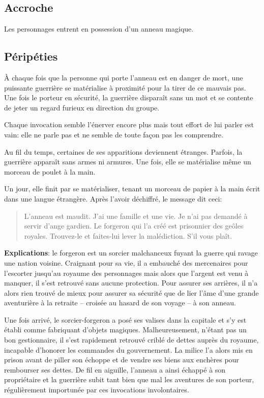 \documentclass[a5paper,pagesize,10pt,bibliography=totoc,numbers=noenddot,
headings=normal,DIV=9,twoside=false]{scrbook}
\begin{document}
\subsection*{Accroche}

Les personnages entrent en possession d'un anneau magique.

\subsection*{Péripéties}

À chaque fois que la personne qui porte l'anneau est en danger de mort, une puissante guerrière se matérialise à proximité pour la tirer de ce mauvais pas.
Une fois le porteur en sécurité, la guerrière disparaît sans un mot et se contente de jeter un regard furieux en direction du groupe.

Chaque invocation semble l'énerver encore plus mais tout effort de lui parler est vain: elle ne parle pas et ne semble de toute façon pas les comprendre.

Au fil du temps, certaines de ses apparitions deviennent étranges. Parfois, la guerrière apparaît sans armes ni armures.
Une fois, elle se matérialise même un morceau de poulet à la main.

Un jour, elle finit par se matérialiser, tenant un morceau de papier à la main écrit dans une langue étrangère.
Après l'avoir déchiffré, le message dit ceci:
\blockquote{L'anneau est maudit. J'ai une famille et une vie. Je n'ai pas demandé à servir d'ange gardien. Le forgeron qui l'a créé est prisonnier des geôles royales. Trouvez-le et faites-lui lever la malédiction. S'il vous plaît.}


\textbf{Explications}: le forgeron est un sorcier malchanceux fuyant la guerre qui ravage une nation voisine.
Craignant pour sa vie, il a embauché des mercenaires pour l'escorter jusqu'au royaume des personnages mais alors que l'argent est venu à manquer, il s'est retrouvé sans aucune protection.
Pour assurer ses arrières, il n'a alors rien trouvé de mieux pour assurer sa sécurité que de lier l'âme d'une grande aventurière à la retraite -- croisée au hasard de son voyage -- à son anneau.

Une fois arrivé, le sorcier-forgeron a posé ses valises dans la capitale et s'y est établi comme fabriquant d'objets magiques.
Malheureusement, n'étant pas un bon gestionnaire, il s'est rapidement retrouvé criblé de dettes auprès du royaume, incapable d'honorer les commandes du gouvernement.
La milice l'a alors mis en prison avant de piller son échoppe et de vendre ses biens aux enchères pour rembourser ses dettes.
De fil en aiguille, l'anneau a ainsi échappé à son propriétaire et la guerrière subit tant bien que mal les aventures de son porteur, régulièrement importunée par ces invocations involontaires.
\end{document}
